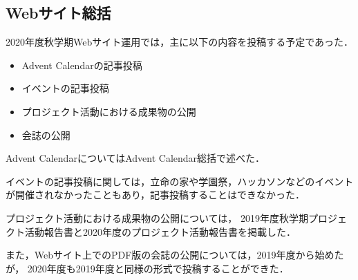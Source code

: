 \subsection*{Webサイト総括}



2020年度秋学期Webサイト運用では，主に以下の内容を投稿する予定であった．

\begin{itemize}
  \item Advent Calendarの記事投稿
  \item イベントの記事投稿
  \item プロジェクト活動における成果物の公開
  \item 会誌の公開
\end{itemize}

Advent CalendarについてはAdvent Calendar総括で述べた．

イベントの記事投稿に関しては，立命の家や学園祭，ハッカソンなどのイベントが開催されなかったこともあり，記事投稿することはできなかった．

プロジェクト活動における成果物の公開については，
2019年度秋学期プロジェクト活動報告書と2020年度のプロジェクト活動報告書を掲載した．

また，Webサイト上でのPDF版の会誌の公開については，2019年度から始めたが，
2020年度も2019年度と同様の形式で投稿することができた．
